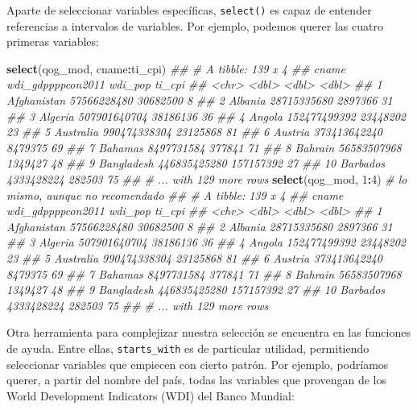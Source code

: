 \documentclass[]{book}
\newenvironment{Shaded}{\begin{snugshade}}{\end{snugshade}}
\newcommand{\CommentTok}[1]{\textcolor[rgb]{0.56,0.35,0.01}{\textit{#1}}}
\newcommand{\DecValTok}[1]{\textcolor[rgb]{0.00,0.00,0.81}{#1}}
\newcommand{\KeywordTok}[1]{\textcolor[rgb]{0.13,0.29,0.53}{\textbf{#1}}}
\newcommand{\NormalTok}[1]{#1}
\newcommand{\OperatorTok}[1]{\textcolor[rgb]{0.81,0.36,0.00}{\textbf{#1}}}
\begin{document}
Aparte de seleccionar variables específicas, \texttt{select()} es capaz
de entender referencias a intervalos de variables. Por ejemplo, podemos
querer las cuatro primeras variables:

\begin{Shaded}
\begin{Highlighting}[]
\KeywordTok{select}\NormalTok{(qog_mod, cname}\OperatorTok{:}\NormalTok{ti_cpi)}
\CommentTok{## # A tibble: 139 x 4}
\CommentTok{##    cname       wdi_gdppppcon2011   wdi_pop ti_cpi}
\CommentTok{##    <chr>                   <dbl>     <dbl>  <dbl>}
\CommentTok{##  1 Afghanistan       57566228480  30682500      8}
\CommentTok{##  2 Albania           28715335680   2897366     31}
\CommentTok{##  3 Algeria          507901640704  38186136     36}
\CommentTok{##  4 Angola           152477499392  23448202     23}
\CommentTok{##  5 Australia        990474338304  23125868     81}
\CommentTok{##  6 Austria          373413642240   8479375     69}
\CommentTok{##  7 Bahamas            8497731584    377841     71}
\CommentTok{##  8 Bahrain           56583507968   1349427     48}
\CommentTok{##  9 Bangladesh       446835425280 157157392     27}
\CommentTok{## 10 Barbados           4333428224    282503     75}
\CommentTok{## # ... with 129 more rows}
\KeywordTok{select}\NormalTok{(qog_mod, }\DecValTok{1}\OperatorTok{:}\DecValTok{4}\NormalTok{) }\CommentTok{# lo mismo, aunque no recomendado}
\CommentTok{## # A tibble: 139 x 4}
\CommentTok{##    cname       wdi_gdppppcon2011   wdi_pop ti_cpi}
\CommentTok{##    <chr>                   <dbl>     <dbl>  <dbl>}
\CommentTok{##  1 Afghanistan       57566228480  30682500      8}
\CommentTok{##  2 Albania           28715335680   2897366     31}
\CommentTok{##  3 Algeria          507901640704  38186136     36}
\CommentTok{##  4 Angola           152477499392  23448202     23}
\CommentTok{##  5 Australia        990474338304  23125868     81}
\CommentTok{##  6 Austria          373413642240   8479375     69}
\CommentTok{##  7 Bahamas            8497731584    377841     71}
\CommentTok{##  8 Bahrain           56583507968   1349427     48}
\CommentTok{##  9 Bangladesh       446835425280 157157392     27}
\CommentTok{## 10 Barbados           4333428224    282503     75}
\CommentTok{## # ... with 129 more rows}
\end{Highlighting}
\end{Shaded}

Otra herramienta para complejizar nuestra selección se encuentra en las
funciones de ayuda. Entre ellas, \texttt{starts\_with} es de particular
utilidad, permitiendo seleccionar variables que empiecen con cierto
patrón. Por ejemplo, podríamos querer, a partir del nombre del país,
todas las variables que provengan de los World Development Indicators
(WDI) del Banco Mundial:
\end{document}
